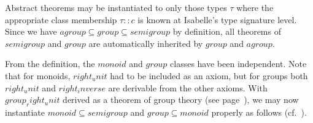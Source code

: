 \begin{isabelle}
\begin{isamarkuptext}
\medskip Abstract theorems may be instantiated to only those types
 $\tau$ where the appropriate class membership $\tau :: c$ is known at
 Isabelle's type signature level.  Since we have $agroup \subseteq
 group \subseteq semigroup$ by definition, all theorems of $semigroup$
 and $group$ are automatically inherited by $group$ and $agroup$.%
\end{isamarkuptext}%
%
%
\begin{isamarkuptext}%
From the definition, the $monoid$ and $group$ classes have been
 independent.  Note that for monoids, $right_unit$ had to be included
 as an axiom, but for groups both $right_unit$ and $right_inverse$ are
 derivable from the other axioms.  With $group_right_unit$ derived as
 a theorem of group theory (see page~\pageref{thm:group-right-unit}),
 we may now instantiate $monoid \subseteq semigroup$ and $group
 \subseteq monoid$ properly as follows
 (cf.\ ).


\end{isamarkuptext}
\end{isabelle}
